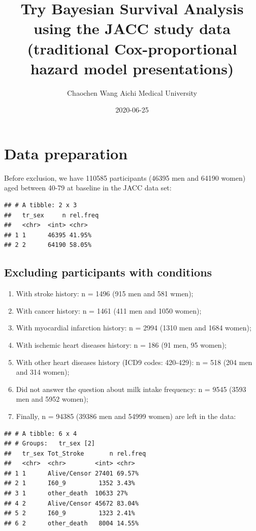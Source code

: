 \documentclass[]{tufte-handout}
\title{Try Bayesian Survival Analysis using the JACC study data
(traditional Cox-proportional hazard model presentations)}
\author{Chaochen Wang \textbar{} Aichi Medical University}
\date{2020-06-25}
\providecommand{\tightlist}{%
  \setlength{\itemsep}{0pt}\setlength{\parskip}{0pt}}
\begin{document}
\maketitle




\hypertarget{data-preparation}{%
\section{Data preparation}\label{data-preparation}}

Before exclusion, we have 110585 participants (46395 men and 64190
women) aged between 40-79 at baseline in the JACC data set:

\begin{verbatim}
## # A tibble: 2 x 3
##   tr_sex     n rel.freq
##   <chr>  <int> <chr>   
## 1 1      46395 41.95%  
## 2 2      64190 58.05%
\end{verbatim}

\hypertarget{excluding-participants-with-conditions}{%
\subsection{Excluding participants with
conditions}\label{excluding-participants-with-conditions}}

\begin{enumerate}
\def\labelenumi{\arabic{enumi}.}
\tightlist
\item
  With stroke history: n = 1496 (915 men and 581 wmen);
\item
  With cancer history: n = 1461 (411 men and 1050 women);
\item
  With myocardial infarction history: n = 2994 (1310 men and 1684
  women);
\item
  With ischemic heart diseases history: n = 186 (91 men, 95 women);
\item
  With other heart diseases history (ICD9 codes: 420-429): n = 518 (204
  men and 314 women);
\item
  Did not answer the question about milk intake frequency: n = 9545
  (3593 men and 5952 women);
\item
  Finally, n = 94385 (39386 men and 54999 women) are left in the data:
\end{enumerate}

\begin{verbatim}
## # A tibble: 6 x 4
## # Groups:   tr_sex [2]
##   tr_sex Tot_Stroke       n rel.freq
##   <chr>  <chr>        <int> <chr>   
## 1 1      Alive/Censor 27401 69.57%  
## 2 1      I60_9         1352 3.43%   
## 3 1      other_death  10633 27%     
## 4 2      Alive/Censor 45672 83.04%  
## 5 2      I60_9         1323 2.41%   
## 6 2      other_death   8004 14.55%
\end{verbatim}
\end{document}
